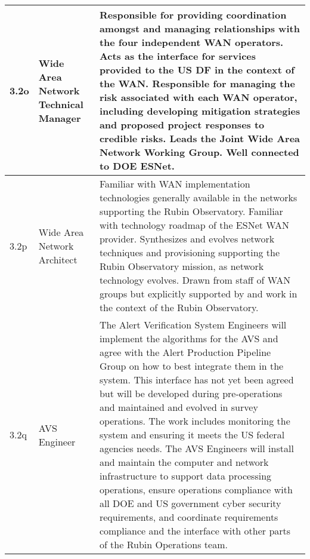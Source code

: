 \begin{longtable} {|p{}|p{}|p{}|}
{3.2o}&{Wide Area Network Technical Manager}&{Responsible for providing coordination amongst and managing relationships with the four independent WAN operators. Acts as the interface for services provided to the US DF in the context of the WAN. Responsible for managing the risk associated with each WAN operator, including developing mitigation strategies and proposed project responses to credible risks. Leads the Joint Wide Area Network Working Group. Well connected to DOE ESNet.} \\ \hline
{3.2p}&{Wide Area Network Architect}&{Familiar with WAN implementation technologies generally available in the networks supporting the Rubin Observatory. Familiar with technology roadmap of the ESNet WAN provider. Synthesizes and evolves network techniques and provisioning supporting the Rubin Observatory mission, as network technology evolves. Drawn from staff of WAN groups but explicitly supported by and work in the context of the Rubin Observatory.} \\ \hline
{3.2q}&{AVS Engineer}&{The Alert Verification System Engineers will implement the algorithms for the AVS and agree with the Alert Production Pipeline Group on how to best integrate them in the system. This interface has not yet been agreed but will be developed during pre-operations and maintained and evolved in survey operations. The work includes monitoring the system and ensuring it meets the US federal agencies needs. The AVS Engineers will install and maintain the computer and network infrastructure to support data processing operations, ensure operations compliance with all DOE and US government cyber security requirements, and coordinate requirements compliance and the interface with other parts of the Rubin Operations team.} \\ \hline
\end{longtable} \normalsize
